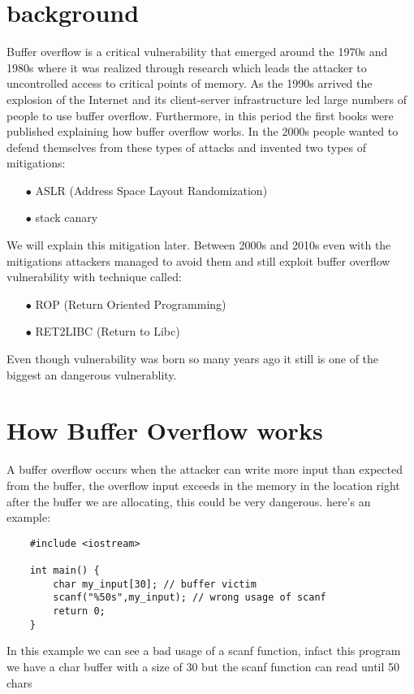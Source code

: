 \documentclass{report}
\begin{document}
    \section{background} %
    Buffer overflow is a critical vulnerability that emerged around the 1970s and 1980s where it was 
    realized through research which leads the attacker to uncontrolled access to critical points of memory.\newline
    As the 1990s arrived the explosion of the Internet and its client-server infrastructure led large numbers of people to use buffer overflow.\newline
    Furthermore, in this period the first books were published explaining how buffer overflow works.\newline
    In the 2000s people wanted to defend themselves from these types of attacks and invented two types of mitigations:\newline
    \begin{itemize}
        \item[$\bullet$] ASLR (Address Space Layout Randomization)
        \item[$\bullet$] stack canary 
    \end{itemize}
    We will explain this mitigation later.\newline
    Between 2000s and 2010s even with the mitigations attackers managed to avoid them and still exploit buffer overflow vulnerability with technique called:\newline
        \begin{itemize}
        \item[$\bullet$] ROP (Return Oriented Programming)
        \item[$\bullet$] RET2LIBC (Return to Libc)
    \end{itemize}
    Even though vulnerability was born so many years ago it still is one of the biggest an dangerous vulnerablity.
    \clearpage
    \section{How Buffer Overflow works}
    A buffer overflow occurs when the attacker can write more input than expected from the buffer, the overflow input exceeds in the memory in the location right after the buffer we are allocating, this could be very dangerous.
    here's an example:
    \begin{verbatim}
    #include <iostream>
    
    int main() {
        char my_input[30]; // buffer victim 
        scanf("%50s",my_input); // wrong usage of scanf  
        return 0;
    }
    \end{verbatim}
    In this example we can see a bad usage of a scanf function, infact this program we have a char buffer with a size of 30 but the scanf function can read until 50 chars 
    \clearpage
\end{document}
